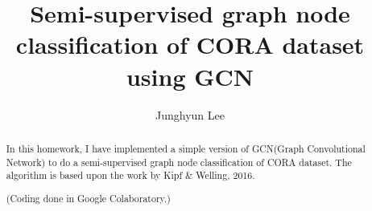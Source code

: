 \documentclass[a4paper, twoside]{report}
\title{Semi-supervised graph node classification of CORA dataset using GCN}
\author{Junghyun Lee}
\begin{document}


\begin{abstract}
In this homework, I have implemented a simple version of GCN(Graph Convolutional Network) to do a semi-supervised graph node classification of CORA dataset.
The algorithm is based upon the work by Kipf \& Welling, 2016.

(Coding done in Google Colaboratory.)
\end{abstract}
 
\tableofcontents





\notecite{}
\printbibliography 
%
%
\end{document}
